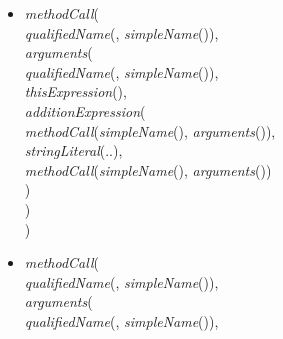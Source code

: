 \begin{itemize} [leftmargin=0.7in]
\item \textit{methodCall}(\\
\hspace*{1em}\textit{qualifiedName}(, \textit{simpleName}()),\\
\hspace*{1em}\textit{arguments}(\\
\hspace*{2em}\textit{qualifiedName}(, \mbox{\textit{simpleName}()}),\\
\hspace*{2em}\textit{thisExpression}(),\\
\hspace*{2em}\textit{additionExpression}(\\
\hspace*{3em}\textit{methodCall}(\textit{simpleName}(), \textit{arguments}()),\\
\hspace*{3em}\textit{stringLiteral}(..),\\
\hspace*{3em}\textit{methodCall}(\textit{simpleName}(), \textit{arguments}())\\
\hspace*{2em})\\
\hspace*{1em})\\
)
\item \textit{methodCall}(\\
\hspace*{1em}\textit{qualifiedName}(, \textit{simpleName}()),\\
\hspace*{1em}\textit{arguments}(\\
\hspace*{2em}\textit{qualifiedName}(, \mbox{\textit{simpleName}()}),\\

\end{itemize}
